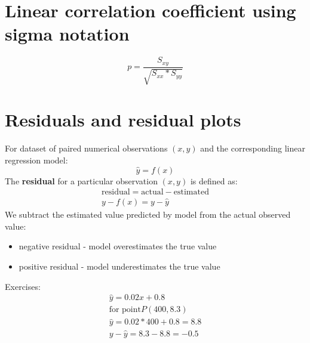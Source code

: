 \documentclass{article}
\begin{document}
\section{Linear correlation coefficient using sigma notation}
\begin{equation}
  p = \frac{S_{xy}}{\sqrt{S_{xx} * S_{yy}}}
\end{equation}
\section{Residuals and residual plots}
For dataset of paired numerical observations $(x, y)$ and the corresponding
linear regression model:
\begin{equation}
  \hat y = f(x)
\end{equation}
The \textbf{residual} for a particular observation $(x, y)$ is defined as:
\begin{equation}
  \begin{gathered}
    \text{residual} = \text{actual} - \text{estimated} \\
    y - f(x) = y - \hat y
  \end{gathered}
\end{equation}
We subtract the estimated value predicted by model from the actual observed
value:
\begin{itemize}
\item negative residual - model overestimates the true value
\item positive residual - model underestimates the true value
\end{itemize}

Exercises:
\begin{equation}
  \begin{gathered}
    \hat y = 0.02x + 0.8 \\
    \text{for point} P(400, 8.3) \\
    \hat y = 0.02 * 400 + 0.8 = 8.8 \\
    y - \hat y = 8.3 - 8.8 = -0.5
  \end{gathered}
\end{equation}
\end{document}
